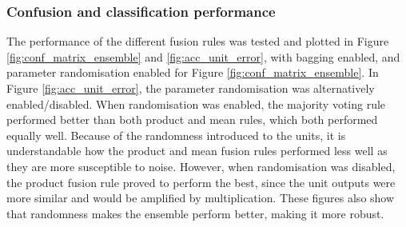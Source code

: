 \documentclass[10pt,technote]{IEEEtran}
\begin{document}
\subsubsection{Confusion and classification performance}
The performance of the different fusion rules was tested and plotted in Figure \ref{fig:conf_matrix_ensemble} and \ref{fig:acc_unit_error}, with bagging enabled, and parameter randomisation enabled for Figure \ref{fig:conf_matrix_ensemble}. In Figure \ref{fig:acc_unit_error}, the parameter randomisation was alternatively enabled/disabled. When randomisation was enabled, the majority voting rule performed better than both product and mean rules, which both performed equally well. Because of the randomness introduced to the units, it is understandable how the product and mean fusion rules performed less well as they are more susceptible to noise. However, when randomisation was disabled, the product fusion rule proved to perform the best, since the unit outputs were more similar and would be amplified by multiplication. These figures also show that randomness makes the ensemble perform better, making it more robust.
\end{document}

